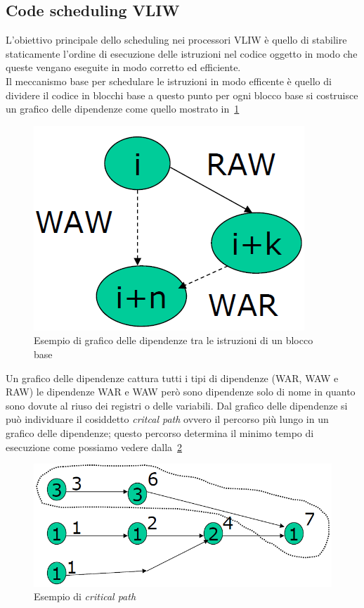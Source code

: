 \subsection{Code scheduling VLIW}
L'obiettivo principale dello scheduling nei processori VLIW è quello di stabilire staticamente l'ordine di esecuzione delle istruzioni nel codice oggetto in modo che queste vengano eseguite in modo corretto ed efficiente.\\
Il meccanismo base per schedulare le istruzioni in modo efficente è quello di dividere il codice in blocchi base a questo punto per ogni blocco base si costruisce un grafico delle dipendenze come quello mostrato in \figurename\,\ref{fig:depgrap}
\begin{figure}[htb]
\centering
\includegraphics[scale=0.5]{img/depgrap.png}
\caption{Esempio di grafico delle dipendenze tra le istruzioni di un blocco base}\label{fig:depgrap}
\end{figure}
Un grafico delle dipendenze cattura tutti i tipi di dipendenze (WAR, WAW e RAW) le dipendenze WAR e WAW però sono dipendenze solo di nome in quanto sono dovute al riuso dei registri o delle variabili. Dal grafico delle dipendenze si può individuare il cosiddetto \emph{critcal path} ovvero il percorso più lungo in un grafico delle dipendenze; questo percorso determina il minimo tempo di esecuzione come possiamo vedere dalla \figurename\,\ref{fig:criticalpath}
\begin{figure}[htb]
\centering
\includegraphics[scale=0.5]{img/criticalpath.png}
\caption{Esempio di \emph{critical path}}\label{fig:criticalpath}
\end{figure}
